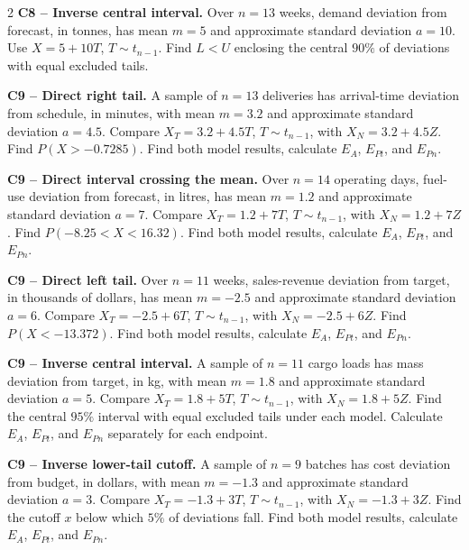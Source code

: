 \begin{multicols}{2}
\textbf{C8 -- Inverse central interval.} Over $n=13$ weeks, demand deviation from forecast, in tonnes, has mean $m=5$ and approximate standard deviation $a=10$. Use $X=5+10T$, $T\sim t_{n-1}$.
Find $L<U$ enclosing the central $90\%$ of deviations with equal excluded tails. 

\textbf{C9 -- Direct right tail.} A sample of $n=13$ deliveries has arrival-time deviation from schedule, in minutes, with mean $m=3.2$ and approximate standard deviation $a=4.5$. Compare $X_T=3.2+4.5T$, $T\sim t_{n-1}$, with $X_N=3.2+4.5Z$.
Find $P(X>-0.7285)$. Find both model results, calculate $E_A$, $E_{Pt}$, and $E_{Pn}$. 

\textbf{C9 -- Direct interval crossing the mean.} Over $n=14$ operating days, fuel-use deviation from forecast, in litres, has mean $m=1.2$ and approximate standard deviation $a=7$. Compare $X_T=1.2+7T$, $T\sim t_{n-1}$, with $X_N=1.2+7Z$.
Find $P(-8.25<X<16.32)$. Find both model results, calculate $E_A$, $E_{Pt}$, and $E_{Pn}$. 

\textbf{C9 -- Direct left tail.} Over $n=11$ weeks, sales-revenue deviation from target, in thousands of dollars, has mean $m=-2.5$ and approximate standard deviation $a=6$. Compare $X_T=-2.5+6T$, $T\sim t_{n-1}$, with $X_N=-2.5+6Z$.
Find $P(X<-13.372)$. Find both model results, calculate $E_A$, $E_{Pt}$, and $E_{Pn}$. 

\textbf{C9 -- Inverse central interval.} A sample of $n=11$ cargo loads has mass deviation from target, in kg, with mean $m=1.8$ and approximate standard deviation $a=5$. Compare $X_T=1.8+5T$, $T\sim t_{n-1}$, with $X_N=1.8+5Z$.
Find the central $95\%$ interval with equal excluded tails under each model. Calculate $E_A$, $E_{Pt}$, and $E_{Pn}$ separately for each endpoint. 

\textbf{C9 -- Inverse lower-tail cutoff.} A sample of $n=9$ batches has cost deviation from budget, in dollars, with mean $m=-1.3$ and approximate standard deviation $a=3$. Compare $X_T=-1.3+3T$, $T\sim t_{n-1}$, with $X_N=-1.3+3Z$.
Find the cutoff $x$ below which $5\%$ of deviations fall. Find both model results, calculate $E_A$, $E_{Pt}$, and $E_{Pn}$. 


\end{multicols}
